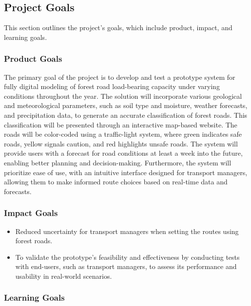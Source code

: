 \newpage

\subsection{Project Goals}

This section outlines the project's goals, which include product, impact, and learning goals.

\subsubsection{Product Goals}

The primary goal of the project is to develop and test a prototype system for fully digital modeling of forest road load-bearing capacity under varying conditions throughout the year. The solution will incorporate various geological and meteorological parameters, such as soil type and moisture, weather forecasts, and precipitation data, to generate an accurate classification of forest roads. This classification will be presented through an interactive map-based website. The roads will be color-coded using a traffic-light system, where green indicates safe roads, yellow signals caution, and red highlights unsafe roads. The system will provide users with a forecast for road conditions at least a week into the future, enabling better planning and decision-making. Furthermore, the system will prioritize ease of use, with an intuitive interface designed for transport managers, allowing them to make informed route choices based on real-time data and forecasts. 

\subsubsection{Impact Goals}

\begin{itemize}
    \item Reduced uncertainty for transport managers when setting the routes using forest roads.
    \item To validate the prototype's feasibility and effectiveness by conducting tests with end-users, such as transport managers, to assess its performance and usability in real-world scenarios.
\end{itemize}

\subsubsection{Learning Goals}

